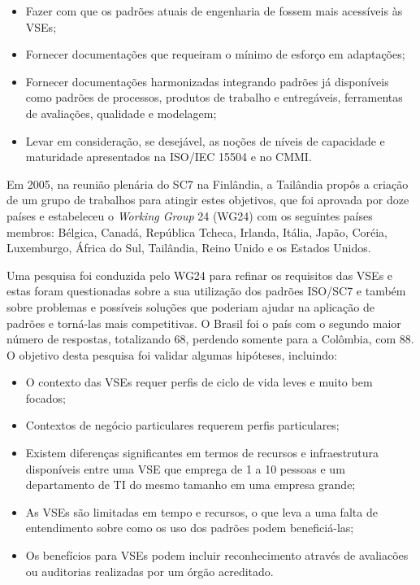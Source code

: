 
\begin{itemize}

\item Fazer com que os padrões atuais de engenharia de \sw fossem mais acessíveis às VSEs;

\item Fornecer documentações que requeiram o mínimo de esforço em adaptações;

\item Fornecer documentações harmonizadas integrando padrões já disponíveis como padrões de processos, produtos de trabalho e entregáveis, ferramentas de avaliações, qualidade e modelagem;

\item Levar em consideração, se desejável, as noções de níveis de capacidade e maturidade apresentados na ISO/IEC 15504 e no CMMI.

\end{itemize}

Em 2005, na reunião plenária do SC7 na Finlândia, a Tailândia propôs a criação de um grupo de trabalhos para atingir estes objetivos, que foi aprovada por doze países e estabeleceu o \textit{Working Group} 24 (WG24) com os seguintes países membros: Bélgica, Canadá, República Tcheca, Irlanda, Itália, Japão, Coréia, Luxemburgo, África do Sul, Tailândia, Reino Unido e os Estados Unidos.

Uma pesquisa foi conduzida pelo WG24 para refinar os requisitos das VSEs e estas foram questionadas sobre a sua utilização dos padrões ISO/SC7 e também sobre problemas e possíveis soluções que poderiam ajudar na aplicação de padrões e torná-las mais competitivas. O Brasil foi o país com o segundo maior número de respostas, totalizando 68, perdendo somente para a Colômbia, com 88. O objetivo desta pesquisa foi validar algumas hipóteses, incluindo:

\begin{itemize}

\item O contexto das VSEs requer perfis de ciclo de vida leves e muito bem focados;

\item Contextos de negócio particulares requerem perfis particulares;

\item Existem diferenças significantes em termos de recursos e infraestrutura disponíveis entre uma VSE que emprega de 1 a 10 pessoas e um departamento de TI do mesmo tamanho em uma empresa grande;

\item As VSEs são limitadas em tempo e recursos, o que leva a uma falta de entendimento sobre como os uso dos padrões podem beneficiá-las;

\item Os benefícios para VSEs podem incluir reconhecimento através de avaliacões ou auditorias realizadas por um órgão acreditado.

\end{itemize}

